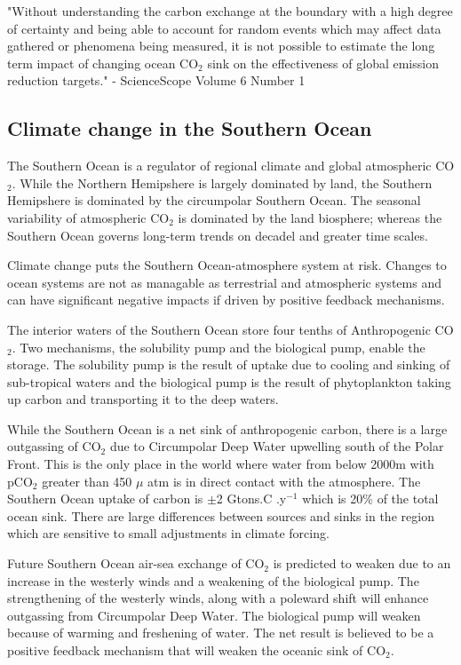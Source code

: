 \documentclass[11pt, a4paper]{article}
\numberwithin{figure}{section}
\numberwithin{table}{section}
\begin{document}
"Without understanding the carbon exchange at the boundary with a high 
degree of certainty and being able to account for random events which 
may affect data gathered or phenomena being measured, it is not 
possible to estimate the long term impact of changing ocean CO${_2}$
sink on the effectiveness of global emission reduction targets." - 
ScienceScope Volume 6 Number 1


\subsection{Climate change in the Southern Ocean}
The Southern Ocean is a regulator of regional climate and global 
atmospheric CO${_2}$.
While the Northern Hemipshere is largely dominated by land, the 
Southern Hemipshere is dominated by the circumpolar Southern Ocean.
The seasonal variability of atmospheric CO${_2}$ is dominated by the 
land biosphere; 
whereas the Southern Ocean governs long-term trends on decadel and 
greater time scales.

Climate change puts the Southern Ocean-atmosphere system at risk. 
Changes to ocean systems are not as managable as terrestrial and 
atmospheric systems and can have significant negative impacts 
if driven by positive feedback mechanisms.

The interior waters of the Southern Ocean store four tenths of 
Anthropogenic CO${_2}$.
Two mechanisms, the solubility pump and the biological pump, enable 
the storage. 
The solubility pump is the result of uptake due to cooling and sinking 
of sub-tropical waters and the biological pump is the result of 
phytoplankton taking up carbon and transporting it to the deep waters.

While the Southern Ocean is a net sink of anthropogenic carbon, there 
is a large outgassing of CO${_2}$ due to Circumpolar Deep Water 
upwelling south of the Polar Front. 
This is the only place in the world where water from below 2000m with 
pCO${_2}$ greater than 450 ${\mu}$ atm is in direct contact with the 
atmosphere.
The Southern Ocean uptake of carbon is ${\pm}$2 Gtons.C .y$^{-1}$ which
is 20\% of the total ocean sink.
There are large differences between sources and sinks in the region 
which are sensitive to small adjustments in climate forcing.

Future Southern Ocean air-sea exchange of CO${_2}$ is predicted to 
weaken due to an increase in the westerly winds and a weakening of the 
biological pump.
The strengthening of the westerly winds, along with a poleward shift 
will enhance outgassing from Circumpolar Deep Water.
The biological pump will weaken because of warming and freshening of 
water. 
The net result is believed to be a positive feedback mechanism that 
will weaken the oceanic sink of CO${_2}$.
\end{document}
